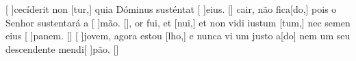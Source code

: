{    %
    {[ ]{ce}cíderit non [tur,] quia Dóminus susténtat [ ]{e}ius. [\LinkLA]}%
        { cair, não fica[do,] pois o Senhor sustentará a [ ]{mão}. [\LinkPT]},
    {or fui, et [nui,] et non vidi iustum [tum,] nec semen eius [ ]{pa}nem. [\LinkLA]}%
        {[ ]{jo}vem, agora estou [lho,] e nunca vi um justo a[\-do] nem um seu descendente mendi[ ]{pão}. [\LinkPT]}
}